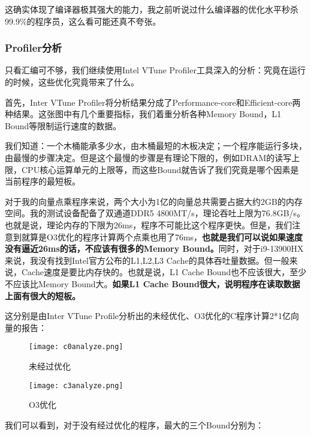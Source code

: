 \documentclass[11pt]{article}
\begin{document}
这确实体现了编译器极其强大的能力，我之前听说过什么编译器的优化水平秒杀99.9$\%$的程序员，这么看可能还真不夸张。

\subsubsection{Profiler分析}
只看汇编可不够，我们继续使用Intel VTune Profiler工具深入的分析：究竟在运行的时候，这些优化究竟带来了什么。


首先，Inter VTune Profiler将分析结果分成了Performance-core和Efficient-core两种结果。这张图中有几个重要指标，我们着重分析各种Memory Bound，L1 Bound等限制运行速度的数据。


我们知道：一个木桶能承多少水，由木桶最短的木板决定；一个程序能运行多块，由最慢的步骤决定。但是这个最慢的步骤是有理论下限的，例如DRAM的读写上限，CPU核心运算单元的上限等，而这些Bound就告诉了我们究竟是哪个因素是当前程序的最短板。


对于我的向量点乘程序来说，两个大小为1亿的向量总共需要占据大约2GB的内存空间。我的测试设备配备了双通道DDR5 4800MT/s，理论吞吐上限为76.8GB/s。也就是说，理论内存的下限为26ms，程序不可能比这个程序更快。但是，我们注意到就算是O3优化的程序计算两个点乘也用了76ms，\textbf{也就是我们可以说如果速度没有逼近26ms的话，不应该有很多的Memory Bound。}同时，对于i9-13900HX来说，我没有找到Intel官方公布的L1,L2,L3 Cache的具体吞吐量数据。但一般来说，Cache速度是要比内存快的。也就是说，L1 Cache Bound也不应该很大，至少不应该比Memory Bound大。\textbf{如果L1 Cache Bound很大，说明程序在读取数据上面有很大的短板。}


这分别是由Inter VTune Profile分析出的未经优化、O3优化的C程序计算2*1亿向量的报告：


\begin{figure}[H]
  \centering
  \begin{minipage}[b]{0.45\textwidth}
    \centering
    \texttt{[image: c0analyze.png]}
   \caption{未经过优化}
    \label{fig:image1}
  \end{minipage}
  \hfill %
  \begin{minipage}[b]{0.45\textwidth}
    \centering
    \texttt{[image: c3analyze.png]}
  \caption{O3优化}
    \label{fig:image2}
  \end{minipage}
\end{figure}


我们可以看到，对于没有经过优化的程序，最大的三个Bound分别为：
\end{document}
